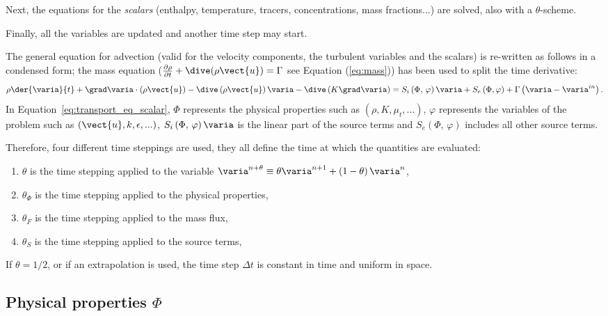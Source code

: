 Next, the equations for the \emph{scalars} (enthalpy, temperature, tracers,
concentrations, mass fractions...) are solved, also with a $\theta$-scheme.

Finally, all the variables are updated and another time step may start.

The general equation for advection (valid for the velocity components, the
turbulent variables and the scalars) is re-written as follows in a condensed
form; the mass equation ($\frac{\partial \rho } {\partial t}+ \dive(\rho
\vect{u}) = \Gamma$ see Equation (\ref{eq:mass})) has been used to split the time derivative:
%
\begin{equation}\label{eq:transport_eq_scalar}
\rho \der{\varia}{t} + \grad \varia \cdot \left(\rho \vect{u} \right) 
- \dive \left(\rho \vect{u} \right) \varia
- \dive \left(K \grad \varia \right) = S_{i}\left(\Phi, \, \varphi\right) \varia + S_{e}\left(\Phi,\varphi \right) 
+ \Gamma \left( \varia - \varia^{in} \right).
\end{equation}
In Equation~\ref{eq:transport_eq_scalar}, $\Phi$ represents the physical properties such as $(\rho,K,\mu_{t},...)$,
$\varphi$ represents the variables of the problem such as $(\vect{u},k,\epsilon,...)$,
$S_{i}\left(\Phi, \, \varphi \right) \varia$ is the linear part of the source terms
and 
$S_{e} \left(\Phi, \, \varphi \right)$  includes all other source terms.

Therefore, four different time steppings are used, they all define the time at which the quantities are evaluated:
%
\begin{enumerate}[ label=\roman{*}/, ref=(\roman{*})]
\item $\theta$ is the time stepping applied to the variable $\varia^{n+\theta} \equiv \theta \varia^{n+1} + \left( 1 - \theta \right) \varia^n$,
\item $\theta_\Phi$ is the time stepping applied to the physical properties,
\item $\theta_F$ is the time stepping applied to the mass flux,
\item $\theta_S$ is the time stepping applied to the source terms,
\end{enumerate}
%

If $\theta=1/2$, or if an extrapolation is used, the time step $\Delta t$ is
constant in time and uniform in space.

\subsection{Physical properties $\Phi$}

